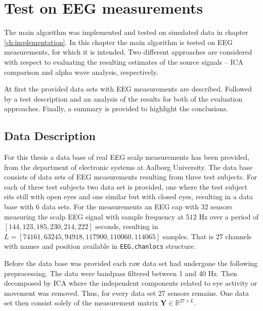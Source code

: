\chapter{Test on EEG measurements}\label{ch:eeg_test}
The main algorithm was implemented and tested on simulated data in chapter \ref{ch:implementation}. 
In this chapter the main algorithm is tested on EEG measurements, for which it is intended. 
Two different approaches are considered with respect to evaluating the resulting estimates of the source signals -- ICA comparison and alpha wave analysis, respectively.

At first the provided data sets with EEG measurements are described. Followed by a test description and an analysis of the results for both of the evaluation approaches. 
Finally, a summary is provided to highlight the conclusions.  

\section{Data Description}
For this thesis a data base of real EEG scalp measurements has been provided, from the department of electronic systems at Aalborg University. 
The data base consists of data sets of EEG measurements resulting from three test subjects. 
For each of three test subjects two data set is provided, one where the test subject sits still with open eyes and one similar but with closed eyes, resulting in a data base with 6 data sets. 
For the measurements an EEG cap with $32$ sensors measuring the scalp EEG signal with sample frequency at $512$ Hz over a period of $[144, 123, 185, 230, 214, 222]$ seconds, resulting in $L = [74161, 63245, 94918, 117900, 110060, 114065]$ samples. 
That is 27 channels with names and position available in \texttt{EEG.chanlocs} structure. 

Before the data base was provided each raw data set had undergone the following preprocessing.
The data were bandpass filtered between 1 and 40 Hz. Then decomposed by ICA where the independent components related to eye activity or movement was removed. Thus, for every data set 27 sensors remains. One data set then consist solely of the measurement matrix $\mathbf{Y} \in \mathbb{R}^{27\times L}$.


